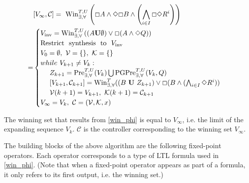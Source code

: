 
\begin{align}
& [V_{\infty},\mathcal{C}] =\  \text{Win}_{\exists, \forall}^{T,U}\left(\Square A \wedge \Diamond \Square B \wedge \left( \bigwedge_{i\in I} \Square \Diamond R^i\right)\right)\\
=&\begin{cases}V_{\text{inv}} = \text{\text{Win}}^{T,U}_{\exists, \forall} ((A\mathbf{U}\emptyset)\vee \Square (A\wedge \Diamond Q))\\
\text{Restrict~ synthesis~ to~ }V_{\text{inv}}\\
V_0 = \emptyset,\ \mathcal{V}=\{\},\ \mathcal{K} = \{\}\\
while\ V_{k+1} \not= V_k:\\
\ \ \ \ Z_{k+1} = \text{Pre}_{\exists,\forall}^{T,U} (V_k) \bigcup \text{PGPre}_{\exists,\forall}^{T,U} (V_k, Q)\\
\ \ \ \ [V_{k+1}, \mathcal{C}_{k+1}]=\text{Win}_{\exists,\forall}^{T} ((B \mathbf{\ U\ }Z_{k+1}) \vee \Square (B\wedge ( \bigwedge_{i\in I}\Diamond R^i))\\
\ \ \ \ \mathcal{V}(k+1)=V_{k+1},\ \mathcal{K}(k+1) = \mathcal{C}_{k+1}\\
V_{\infty} = V_k,\ \mathcal{C}=(\mathcal{V},\mathcal{K},x)
\end{cases}\label{win_phi}
\end{align}

The winning set {\color{purple} that results from} \eqref{win_phi} is {\color{purple} equal to} $ V_{\infty} $, i.e. {\color{purple} the limit of the expanding sequence $V_k$}. $ \mathcal{C} $ is the controller corresponding to the winning set $ V_{\infty} $. 

The building blocks of the above algorithm are the following fixed-point operators. Each operator corresponds to a type of LTL formula used in \eqref{win_phi}. (Note that when a fixed-point operator appears as part of a formula, it only refers to its first output, i.e. the winning set.)

